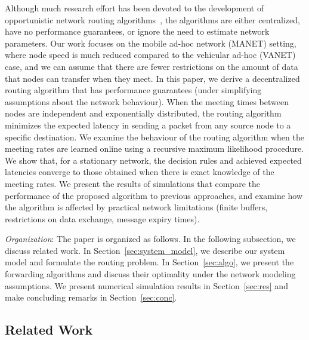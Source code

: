 \documentclass[journal,onecolumn,11pt]{IEEEtran}
\theoremstyle{plain}
\theoremstyle{definition}
\begin{document}
Although much research effort has been devoted to the development of
opportunistic network routing
algorithms~\cite{vahdat2000epidemic,grossglauser2001mobility,spyropoulos2005spray,
  davis2001wearable,lindgren2003probabilistic,burgess2006maxprop,
  jones2007practical,daly2007social,hui2011bubble,sharma2013contact,
  xiao2013community,li2011impact,sermpezis2014understanding,zhang2013gossip,
  conan2008fixed,xiao2013tour,boldrini2010modelling,boldrini2012performance},
the algorithms are either centralized, have no performance guarantees,
or ignore the need to estimate network parameters. Our work focuses on the mobile ad-hoc network (MANET)
setting, where node speed is much reduced compared to the vehicular
ad-hoc (VANET) case, and we can assume that there are fewer
restrictions on the amount of data that nodes can transfer when they meet. In this paper, we
derive a decentralized routing algorithm that has performance
guarantees (under simplifying assumptions about the network
behaviour). When the meeting times between nodes are
independent and exponentially distributed, the routing algorithm
minimizes the expected latency in sending a packet from any source
node to a specific destination. We examine the behaviour of the
routing algorithm when the meeting rates are learned online using a
recursive maximum likelihood procedure. We show that, for a stationary
network, the decision rules and achieved expected latencies converge
to those obtained when there is exact knowledge of the meeting
rates. We present the results of simulations that compare the
performance of the proposed algorithm to previous approaches, and
examine how the algorithm is affected by practical network limitations
(finite buffers, restrictions on data exchange, message expiry times).

{\em Organization}: The paper is organized as follows. In the following
subsection, we discuss related work. In
Section~\ref{sec:system_model}, we describe our system model and
formulate the routing problem. In Section~\ref{sec:algo}, we
present the forwarding algorithms and discuss their
optimality under the network modeling assumptions. We present
numerical simulation results in Section~\ref{sec:res} and make
concluding remarks in Section~\ref{sec:conc}.

\subsection{Related Work}
\end{document}
